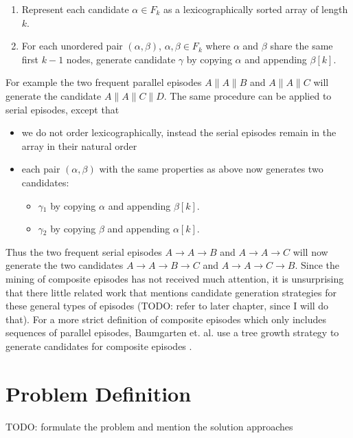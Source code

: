\begin{enumerate}
	\item Represent each candidate $\alpha \in F_k$ as a lexicographically sorted array of length $k$.
	\item For each unordered pair $(\alpha , \beta )$, $\alpha ,\beta \in F_k$ where $\alpha$ and $\beta$ share the same first $k-1$ nodes, generate candidate $\gamma$ by copying $\alpha$ and appending $\beta [k]$.
\end{enumerate}

For example the two frequent parallel episodes $A \| A \| B$ and $A \| A \| C$ will generate the candidate $A \| A \| C \| D$. \newline
The same procedure can be applied to serial episodes, except that
\begin{itemize}
	\item we do not order lexicographically, instead the serial episodes remain in the array in their natural order
	\item each pair $(\alpha , \beta )$ with the same properties as above now generates two candidates:
	\begin{itemize}
		\item $\gamma{_1}$ by copying $\alpha$ and appending $\beta [k]$.
		\item $\gamma{_2}$ by copying $\beta$ and appending $\alpha [k]$.
	\end{itemize}
\end{itemize}

Thus the two frequent serial episodes $A \rightarrow A \rightarrow B$ and $A \rightarrow A \rightarrow C$ will now generate the two candidates $A \rightarrow A \rightarrow B \rightarrow C$ and $A \rightarrow A \rightarrow C \rightarrow B$. \newline
Since the mining of composite episodes has not received much attention, it is unsurprising that there little related work that mentions candidate generation strategies for these general types of episodes (TODO: refer to later chapter, since I will do that). For a more strict definition of composite episodes which only includes sequences of parallel episodes, Baumgarten et. al. use a tree growth strategy to generate candidates for composite episodes \cite{baumgarten2003tree}. %

\section{Problem Definition}
TODO: formulate the problem and mention the solution approaches